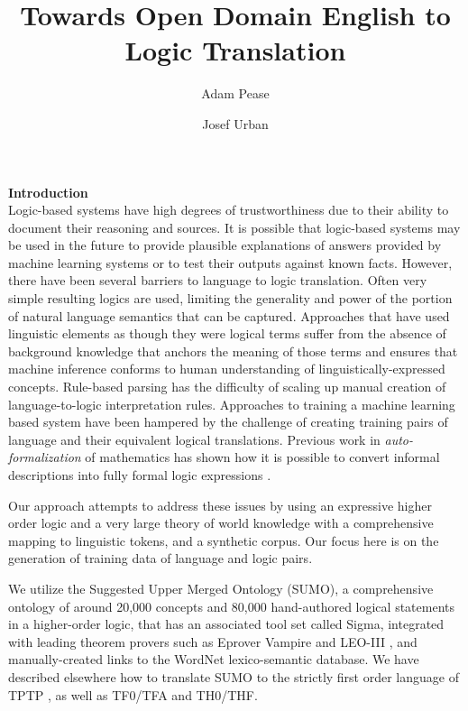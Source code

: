 \documentclass{easychair}
\title{Towards Open Domain English to Logic Translation}
\author{
Adam Pease
\and
Josef Urban
}
\institute{
  Articulate Software, San Jose, CA, USA\\
  \email{apease@articulatesoftware.com}
  \and
  CIIRC, Czech Technical University, Prague, Czechia\\
  \email{jurban@cvut.cz}
 }
\begin{document}
\maketitle

\noindent\textbf{Introduction}\\
\indent Logic-based systems have high degrees of trustworthiness due to
their ability to document their reasoning and sources.  It is possible that logic-based
systems may be used in the future to provide plausible explanations of answers
provided by machine learning systems or to test their outputs against known facts.  
However, there have been several barriers to language to
logic translation.  Often very simple resulting logics are used, limiting the generality
and power of the portion of natural language semantics that can be captured.  Approaches
that have used linguistic elements as though they were logical terms suffer from the 
absence of background knowledge that anchors the meaning of those terms and ensures that
machine inference conforms to human understanding of linguistically-expressed concepts.
Rule-based parsing has
the difficulty of scaling up manual creation of language-to-logic interpretation
rules.  Approaches to training a machine learning based system have been hampered by the challenge of creating training pairs of language
and their equivalent logical translations. 
Previous work in \textit{auto-formalization} of mathematics has shown how it is possible to 
convert informal descriptions into fully formal logic expressions
\cite{Wang2020}.  

Our approach attempts to address these issues by using an expressive higher order logic and 
a very large theory of world knowledge with a comprehensive mapping to linguistic
tokens, and a synthetic corpus.  Our focus here is on the generation of training data of language and
logic pairs. 

We utilize the Suggested Upper Merged Ontology 
(SUMO)\cite{np01,p11}, a comprehensive ontology
of around 20,000 concepts and 80,000 hand-authored logical statements in a 
higher-order logic, that has an associated tool set called Sigma\cite{ps14},
integrated with leading theorem provers such as Eprover \cite{Schulz:AICOM-2002}  
Vampire \cite{Kovacs:2013:FTP:2958031.2958033} and LEO-III \cite{BenzLEO2008}, and manually-created
links\cite{np03} to the WordNet lexico-semantic database\cite{Fellbaum1998}.
We have described \cite{ps14} elsewhere how to translate SUMO to the strictly
first order language of TPTP \cite{tsp08}, as well as TF0/TFA
\cite{Pease2019} and TH0/THF\cite{bp10,bpu23}.
\end{document}
